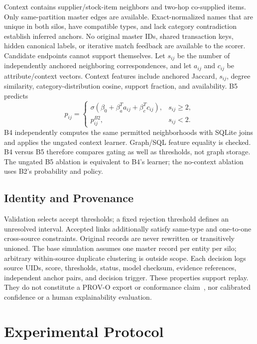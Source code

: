 \documentclass[conference]{IEEEtran}
\begin{document}
Context contains supplier/stock-item neighbors and two-hop co-supplied items. Only same-partition master edges are available. Exact-normalized names that are unique in both silos, have compatible types, and lack category contradiction establish inferred anchors. No original master IDs, shared transaction keys, hidden canonical labels, or iterative match feedback are available to the scorer. Candidate endpoints cannot support themselves. Let $s_{ij}$ be the number of independently anchored neighboring correspondences, and let $a_{ij}$ and $c_{ij}$ be attribute/context vectors. Context features include anchored Jaccard, $s_{ij}$, degree similarity, category-distribution cosine, support fraction, and availability. B5 predicts
\begin{equation}
p_{ij}=\begin{cases}
\sigma(\beta_0+\beta_a^T a_{ij}+\beta_c^T c_{ij}),&s_{ij}\geq2,\\
p^{B2}_{ij},&s_{ij}<2.
\end{cases}
\end{equation}
B4 independently computes the same permitted neighborhoods with SQLite joins and applies the ungated context learner. Graph/SQL feature equality is checked. B4 versus B5 therefore compares gating as well as thresholds, not graph storage. The ungated B5 ablation is equivalent to B4's learner; the no-context ablation uses B2's probability and policy.

\subsection{Identity and Provenance}
Validation selects accept thresholds; a fixed rejection threshold defines an unresolved interval. Accepted links additionally satisfy same-type and one-to-one cross-source constraints. Original records are never rewritten or transitively unioned. The base simulation assumes one master record per entity per silo; arbitrary within-source duplicate clustering is outside scope. Each decision logs source UIDs, score, thresholds, status, model checksum, evidence references, independent anchor pairs, and decision trigger. These properties support replay. They do not constitute a PROV-O export or conformance claim~\cite{prov2013}, nor calibrated confidence or a human explainability evaluation.

\section{Experimental Protocol}
\end{document}
